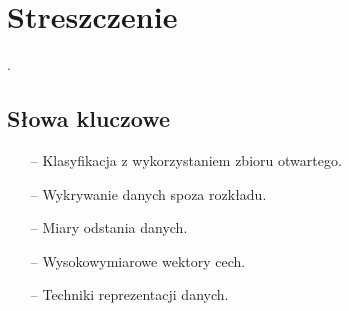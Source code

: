 
\chapter*{Streszczenie}
\label{chapter:streszczenie}

.


\section*{Słowa kluczowe}
\label{section:slowa-kluczowe}

\begin{itemize}
    \item[–] Klasyfikacja z wykorzystaniem zbioru otwartego.
    \item[–] Wykrywanie danych spoza rozkładu.
    \item[–] Miary odstania danych.
    \item[–] Wysokowymiarowe wektory cech.
    \item[–] Techniki reprezentacji danych.
\end{itemize}
